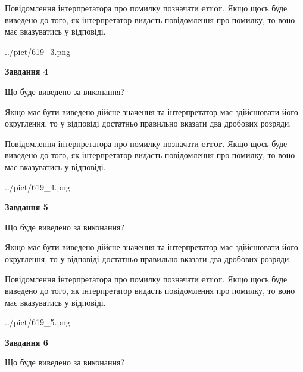 \documentclass[12pt, ukrainian]{article}
\begin{document}
{\begin {Large}
Повідомлення інтерпретатора про помилку позначати \textbf{error}.
Якщо щось буде виведено до того, як інтерпретатор видасть повідомлення про помилку, 
то воно має вказуватись у відповіді. \par

\begin{center}
	{../pict/619_3.png}
\end{center}
\newpage

{\begin {center}\textbf{Завдання 4}\end {center}}\par
Що буде виведено за виконання? \par

Якщо має бути виведено дійсне значення та інтерпретатор має здійснювати його округлення, 
то у відповіді достатньо правильно вказати два дробових розряди.

Повідомлення інтерпретатора про помилку позначати \textbf{error}.
Якщо щось буде виведено до того, як інтерпретатор видасть повідомлення про помилку, 
то воно має вказуватись у відповіді. \par

\begin{center}
	{../pict/619_4.png}
\end{center}
\newpage

{\begin {center}\textbf{Завдання 5}\end {center}}\par
Що буде виведено за виконання? \par

Якщо має бути виведено дійсне значення та інтерпретатор має здійснювати його округлення, 
то у відповіді достатньо правильно вказати два дробових розряди.

Повідомлення інтерпретатора про помилку позначати \textbf{error}.
Якщо щось буде виведено до того, як інтерпретатор видасть повідомлення про помилку, 
то воно має вказуватись у відповіді. \par

\begin{center}
	{../pict/619_5.png}
\end{center}
\newpage

{\begin {center}\textbf{Завдання 6}\end {center}}\par
Що буде виведено за виконання? \par


\end{Large}}
\end{document}
